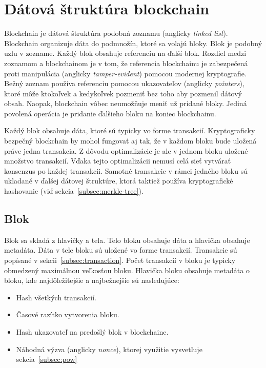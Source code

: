 \section{Dátová štruktúra blockchain}\label{sec:data-struct-blockchain}
Blockchain je dátová štruktúra podobná zoznamu (anglicky \textit{linked list}). Blockchain organizuje dáta do podmnožín, ktoré sa volajú bloky. Blok je podobný uzlu v zozname. Každý blok obsahuje referenciu na ďalší blok. Rozdiel medzi zoznamom a blockchainom je v tom, že referencia blockchainu je zabezpečená proti manipulácia (anglicky \textit{tamper-evident}) pomocou modernej kryptografie. Bežný zoznam používa referenciu pomocou ukazovateľov (anglicky \textit{pointers}), ktoré môže ktokoľvek a kedykoľvek pozmeniť bez toho aby pozmenil dátový obsah. Naopak, blockchain vôbec neumožňuje meniť už pridané bloky. Jediná povolená operácia je pridanie ďalšieho bloku na koniec blockchainu.~\cite{horizenAcademy}

Každý blok obsahuje dáta, ktoré sú typicky vo forme transakcií. Kryptograficky bezpečný blockchain by mohol fungovať aj tak, že v každom bloku bude uložená práve jedna transakcia. Z dôvodu optimalizácie je ale v jednom bloku uložené množstvo transakcií. Vďaka tejto optimalizácii nemusí celá sieť vytvárať konsenzus po každej transakcii. Samotné transakcie v rámci jedného bloku sú ukladané v ďalšej dátovej štruktúre, ktorá taktiež používa kryptografické hashovanie (viď sekcia~\ref{subsec:merkle-tree}).~\cite{narayanan2016bitcoin}

\subsection{Blok}\label{subsec:block}

Blok sa skladá z hlavičky a tela. Telo bloku obsahuje dáta a hlavička obsahuje metadáta. Dáta v tele bloku sú uložené vo forme transakcií. Transakcie sú popísané v sekcii~\ref{subsec:transaction}. Počet transakcií v bloku je typicky obmedzený maximálnou veľkosťou bloku.
Hlavička bloku obsahuje metadáta o bloku, kde najdôležitejšie a najbežnejšie sú nasledujúce:
\begin{itemize}
	\item Hash všetkých transakcií.
	\item Časové razítko vytvorenia bloku.
	\item Hash ukazovateľ na predošlý blok v blockchaine.
	\item Náhodná výzva (anglicky \textit{nonce}), ktorej využitie vysvetľuje sekcia~\ref{subsec:pow}
\end{itemize} 

